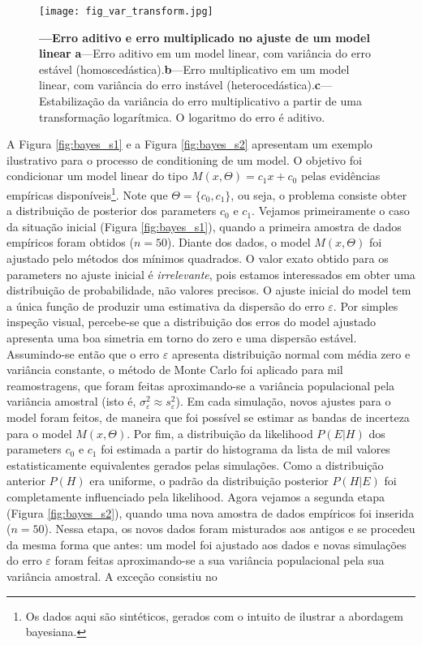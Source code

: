 \documentclass[./main.tex]{subfiles}
\begin{document}
\begin{figure}[t!] %
	\centering				
	\texttt{[image: fig\_var\_transform.jpg]}		
	\caption[Erro aditivo e erro multiplicativo]
	{\textbf{---\;Erro aditivo e erro multiplicado no ajuste de um \gls{model} linear}
        \;\textbf{a}\;---\;Erro aditivo em um \gls{model} linear, com variância do erro estável (homoscedástica).\;\textbf{b}\;---\;Erro multiplicativo em um \gls{model} linear, com variância do erro instável (heterocedástica).\;\textbf{c}\;---\;Estabilização da variância do erro multiplicativo a partir de uma transformação logarítmica. O logaritmo do erro é aditivo.
	}
\label{fig:var_transform}  %
\end{figure}
\par A Figura \ref{fig:bayes_s1} e a Figura \ref{fig:bayes_s2} apresentam um exemplo ilustrativo para o processo de \gls{conditioning} de um \gls{model}. O objetivo foi condicionar um \gls{model} linear do tipo $M(x, \Theta) = c_{1}x + c_{0}$ pelas evidências empíricas disponíveis\footnote{Os dados aqui são sintéticos, gerados com o intuito de ilustrar a abordagem bayesiana.}. Note que $\Theta=\{c_{0}, c_{1}\}$, ou seja, o problema consiste obter a distribuição de \gls{posterior} dos \gls{parameters} $c_0$ e $c_1$. Vejamos primeiramente o caso da situação inicial (Figura \ref{fig:bayes_s1}), quando a primeira amostra de dados empíricos foram obtidos ($n=50$). Diante dos dados, o \gls{model} $M(x, \Theta)$ foi ajustado pelo métodos dos mínimos quadrados. O valor exato obtido para os \gls{parameters} no ajuste inicial é \textit{irrelevante}, pois estamos interessados em obter uma distribuição de probabilidade, não valores precisos. O ajuste inicial do \gls{model} tem a única função de produzir uma estimativa da dispersão do erro $\varepsilon$. Por simples inspeção visual, percebe-se que a distribuição dos erros do \gls{model} ajustado apresenta uma boa simetria em torno do zero e uma dispersão estável. Assumindo-se então que o erro $\varepsilon$ apresenta distribuição normal com média zero e variância constante, o método de Monte Carlo foi aplicado para mil reamostragens, que foram feitas aproximando-se a variância populacional pela variância amostral (isto é, $\sigma^2_\varepsilon \approx s^2_\varepsilon$). Em cada simulação, novos ajustes para o \gls{model} foram feitos, de maneira que foi possível se estimar as bandas de incerteza para o \gls{model} $M(x, \Theta)$.  Por fim, a distribuição da \gls{likelihood} $P(E | H)$ dos \gls{parameters} $c_0$ e $c_1$ foi estimada a partir do histograma da lista de mil valores estatisticamente equivalentes gerados pelas simulações. Como a distribuição anterior $P(H)$ era uniforme, o padrão da distribuição posterior $P(H | E)$ foi completamente influenciado pela \gls{likelihood}. Agora vejamos a segunda etapa (Figura \ref{fig:bayes_s2}), quando uma nova amostra de dados empíricos foi inserida ($n=50$). Nessa etapa, os novos dados foram misturados aos antigos e se procedeu da mesma forma que antes: um \gls{model} foi ajustado aos dados e novas simulações do erro $\varepsilon$ foram feitas aproximando-se a sua variância populacional pela sua variância amostral. A exceção consistiu no 
\end{document}
